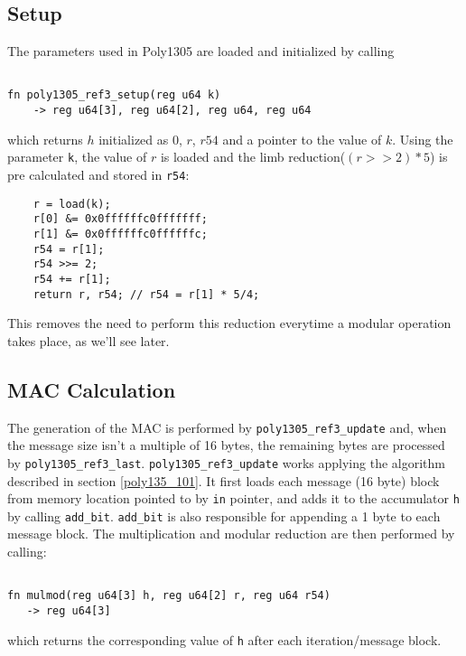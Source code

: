\documentclass[twocolumn]{article}
\begin{document}
\subsection{Setup}
The parameters used in Poly1305 are loaded and initialized by calling 

\begin{Verbatim}[fontsize=\footnotesize]

fn poly1305_ref3_setup(reg u64 k) 
    -> reg u64[3], reg u64[2], reg u64, reg u64

\end{Verbatim}

which returns $h$ initialized as 0, $r$, $r54$ and a pointer to the value of $k$.
Using the parameter \texttt{k}, the value of $r$ is loaded and the limb reduction($(r>>2)*5$) is pre calculated and stored in \texttt{r54}:
\begin{verbatim}
    r = load(k);
    r[0] &= 0x0ffffffc0fffffff;
    r[1] &= 0x0ffffffc0ffffffc;
    r54 = r[1];
    r54 >>= 2;
    r54 += r[1];
    return r, r54; // r54 = r[1] * 5/4;
\end{verbatim}
This removes the need to perform this reduction everytime a modular operation takes place, as we'll see later.

\subsection{MAC Calculation}
The generation of the MAC is performed by \texttt{poly1305\_ref3\_update} and, when the message size isn't a multiple of 16 bytes, the remaining bytes are processed by
\texttt{poly1305\_ref3\_last}.
\newline
\texttt{poly1305\_ref3\_update} works applying the algorithm described in section \ref{poly135_101}. It first loads each message (16 byte) block from memory location
pointed to by \texttt{in} pointer, and adds it to the accumulator \texttt{h} by calling \texttt{add\_bit}. \texttt{add\_bit} is also responsible for appending a 1 byte
to each message block. The multiplication and modular reduction are then performed by calling:

\begin{Verbatim}[fontsize=\footnotesize]

fn mulmod(reg u64[3] h, reg u64[2] r, reg u64 r54) 
   -> reg u64[3]

\end{Verbatim}

which returns the corresponding value of \texttt{h} after each iteration/message block.
\end{document}
